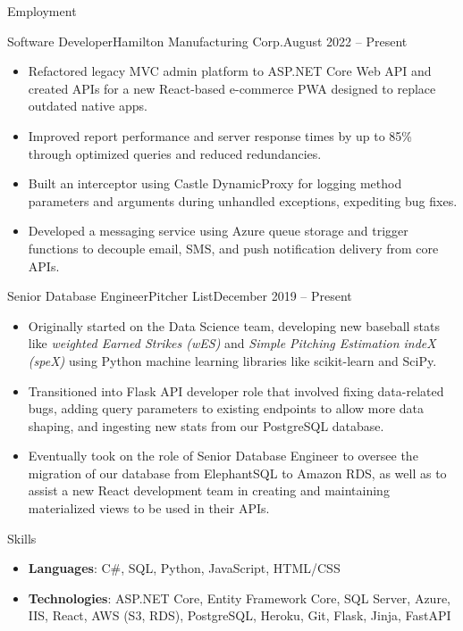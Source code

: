 \documentclass[calibri]{mcdowellcv}
\begin{document}
	\makeheader
	
	\begin{cvsection}{Employment}
		\begin{cvsubsection}{Software Developer}{Hamilton Manufacturing Corp.}{August 2022 -- Present}
			\begin{itemize}
				\item Refactored legacy MVC admin platform to ASP.NET Core Web API and created APIs for a new React-based e-commerce PWA designed to replace outdated native apps. 
				\item Improved report performance and server response times by up to 85\% through optimized queries and reduced redundancies.
				\item Built an interceptor using Castle DynamicProxy for logging method parameters and arguments during unhandled exceptions, expediting bug fixes. 
				\item Developed a messaging service using Azure queue storage and trigger functions to decouple email, SMS, and push notification delivery from core APIs.
			\end{itemize}
		\end{cvsubsection}
		\begin{cvsubsection}{Senior Database Engineer}{Pitcher List}{December 2019 -- Present}
			\begin{itemize}
				\item Originally started on the Data Science team, developing new baseball stats like \textit{weighted Earned Strikes (wES)} and \textit{Simple Pitching Estimation indeX (speX)} using Python machine learning libraries like scikit-learn and SciPy.
				\item Transitioned into Flask API developer role that involved fixing data-related bugs, adding query parameters to existing endpoints to allow more data shaping, and ingesting new stats from our PostgreSQL database.
				\item Eventually took on the role of Senior Database Engineer to oversee the migration of our database from ElephantSQL to Amazon RDS, as well as to assist a new React development team in creating and maintaining materialized views to be used in their APIs.
			\end{itemize}
		\end{cvsubsection}
	\end{cvsection}

	\begin{cvsection}{Skills}
		\begin{cvsubsection}{}{}{}	
			\begin{itemize}
				\item \textbf{Languages}: C\#, SQL, Python, JavaScript, HTML/CSS
				\item \textbf{Technologies}: ASP.NET Core, Entity Framework Core, SQL Server, Azure, IIS, React, AWS (S3, RDS), PostgreSQL, Heroku, Git, Flask, Jinja, FastAPI
			\end{itemize}
		\end{cvsubsection}
	\end{cvsection}
\end{document}

